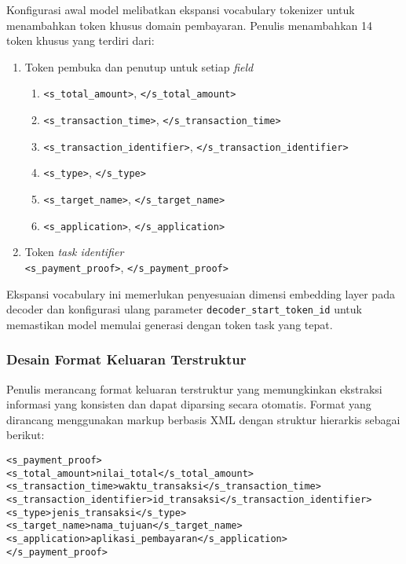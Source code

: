 Konfigurasi awal model melibatkan ekspansi vocabulary tokenizer untuk menambahkan token khusus domain pembayaran. Penulis menambahkan 14 token khusus yang terdiri dari:
\begin{enumerate}
    \item Token pembuka dan penutup untuk setiap \emph{field}
    \begin{enumerate}
    \item \texttt{<s\_total\_amount>}, \texttt{</s\_total\_amount>}
    \item \texttt{<s\_transaction\_time>}, \texttt{</s\_transaction\_time>}
    \item \texttt{<s\_transaction\_identifier>}, \texttt{</s\_transaction\_identifier>}
    \item \texttt{<s\_type>}, \texttt{</s\_type>}
    \item \texttt{<s\_target\_name>}, \texttt{</s\_target\_name>}
    \item \texttt{<s\_application>}, \texttt{</s\_application>}
    \end{enumerate}
    \item Token \emph{task identifier}~\\ \texttt{<s\_payment\_proof>}, \texttt{</s\_payment\_proof>}
\end{enumerate}

Ekspansi vocabulary ini memerlukan penyesuaian dimensi embedding layer pada decoder dan konfigurasi ulang parameter \texttt{decoder\_start\_token\_id} untuk memastikan model memulai generasi dengan token task yang tepat.

\subsubsection{Desain Format Keluaran Terstruktur}
\label{subsubsec:desain-format-keluaran}

Penulis merancang format keluaran terstruktur yang memungkinkan ekstraksi informasi yang konsisten dan dapat diparsing secara otomatis. Format yang dirancang menggunakan markup berbasis XML dengan struktur hierarkis sebagai berikut:

\begin{verbatim}
<s_payment_proof>
<s_total_amount>nilai_total</s_total_amount>
<s_transaction_time>waktu_transaksi</s_transaction_time>
<s_transaction_identifier>id_transaksi</s_transaction_identifier>
<s_type>jenis_transaksi</s_type>
<s_target_name>nama_tujuan</s_target_name>
<s_application>aplikasi_pembayaran</s_application>
</s_payment_proof>
\end{verbatim}

